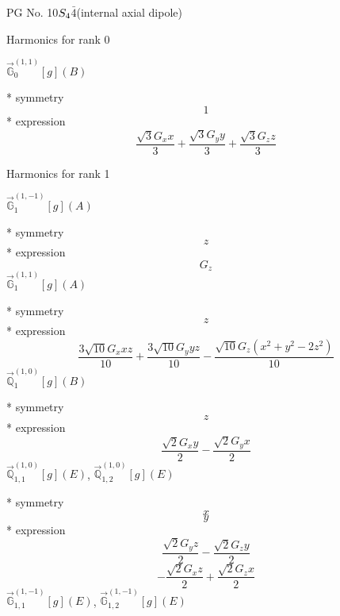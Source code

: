 \documentclass[fleqn,8pt]{jsarticle}
\begin{document}
\setcounter{MaxMatrixCols}{32}

\renewcommand{\tablename}{Table~}
\renewcommand{\figurename}{Figure~}
\begin{center}
\LARGE
PG No. 10\quad$S_{\rm 4}$\quad$\bar{4}$\quad[ tetragonal ] (internal axial dipole)
\end{center}

\noindent * Harmonics for rank 0

\noindent\quad $\vec{\mathbb{G}}_{0}^{(1,1)}[g](B)$

\noindent\quad ** symmetry
\begin{dmath*}
1
\end{dmath*}
\noindent\quad ** expression
\begin{dmath*}
\frac{\sqrt{3} G_{x} x}{3} + \frac{\sqrt{3} G_{y} y}{3} + \frac{\sqrt{3} G_{z} z}{3}
\end{dmath*}

\noindent * Harmonics for rank 1

\noindent\quad $\vec{\mathbb{G}}_{1}^{(1,-1)}[g](A)$

\noindent\quad ** symmetry
\begin{dmath*}
z
\end{dmath*}
\noindent\quad ** expression
\begin{dmath*}
G_{z}
\end{dmath*}
\noindent\quad $\vec{\mathbb{G}}_{1}^{(1,1)}[g](A)$

\noindent\quad ** symmetry
\begin{dmath*}
z
\end{dmath*}
\noindent\quad ** expression
\begin{dmath*}
\frac{3 \sqrt{10} G_{x} x z}{10} + \frac{3 \sqrt{10} G_{y} y z}{10} - \frac{\sqrt{10} G_{z} \left(x^{2} + y^{2} - 2 z^{2}\right)}{10}
\end{dmath*}
\noindent\quad $\vec{\mathbb{Q}}_{1}^{(1,0)}[g](B)$

\noindent\quad ** symmetry
\begin{dmath*}
z
\end{dmath*}
\noindent\quad ** expression
\begin{dmath*}
\frac{\sqrt{2} G_{x} y}{2} - \frac{\sqrt{2} G_{y} x}{2}
\end{dmath*}
\noindent\quad $\vec{\mathbb{Q}}_{1,1}^{(1,0)}[g](E)$, $\vec{\mathbb{Q}}_{1,2}^{(1,0)}[g](E)$

\noindent\quad ** symmetry
\begin{dmath*}
x
\end{dmath*}
\begin{dmath*}
y
\end{dmath*}
\noindent\quad ** expression
\begin{dmath*}
\frac{\sqrt{2} G_{y} z}{2} - \frac{\sqrt{2} G_{z} y}{2}
\end{dmath*}
\begin{dmath*}
- \frac{\sqrt{2} G_{x} z}{2} + \frac{\sqrt{2} G_{z} x}{2}
\end{dmath*}
\noindent\quad $\vec{\mathbb{G}}_{1,1}^{(1,-1)}[g](E)$, $\vec{\mathbb{G}}_{1,2}^{(1,-1)}[g](E)$
\end{document}
